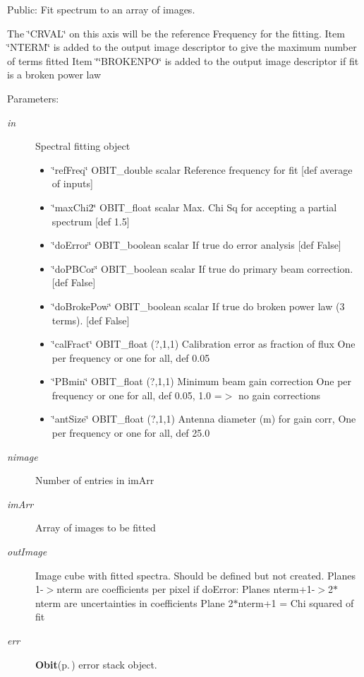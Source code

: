 Public: Fit spectrum to an array of images. 

The \char`\"{}CRVAL\char`\"{} on this axis will be the reference Frequency for the fitting. Item \char`\"{}NTERM\char`\"{} is added to the output image descriptor to give the maximum number of terms fitted Item \char`\"{}\char`\"{}BROKENPO\char`\"{} is added to the output image descriptor if fit is a broken power law \begin{Desc}
\item[Parameters:]
\begin{description}
\item[{\em in}]Spectral fitting object \begin{itemize}
\item \char`\"{}ref\-Freq\char`\"{} OBIT\_\-double scalar Reference frequency for fit [def average of inputs] \item \char`\"{}max\-Chi2\char`\"{} OBIT\_\-float scalar Max. Chi Sq for accepting a partial spectrum [def 1.5] \item \char`\"{}do\-Error\char`\"{} OBIT\_\-boolean scalar If true do error analysis [def False] \item \char`\"{}do\-PBCor\char`\"{} OBIT\_\-boolean scalar If true do primary beam correction.[def False] \item \char`\"{}do\-Broke\-Pow\char`\"{} OBIT\_\-boolean scalar If true do broken power law (3 terms). [def False] \item \char`\"{}cal\-Fract\char`\"{} OBIT\_\-float (?,1,1) Calibration error as fraction of flux One per frequency or one for all, def 0.05 \item \char`\"{}PBmin\char`\"{} OBIT\_\-float (?,1,1) Minimum beam gain correction One per frequency or one for all, def 0.05, 1.0 =$>$ no gain corrections \item \char`\"{}ant\-Size\char`\"{} OBIT\_\-float (?,1,1) Antenna diameter (m) for gain corr, One per frequency or one for all, def 25.0 \end{itemize}
\item[{\em nimage}]Number of entries in im\-Arr \item[{\em im\-Arr}]Array of images to be fitted \item[{\em out\-Image}]Image cube with fitted spectra. Should be defined but not created. Planes 1-$>$nterm are coefficients per pixel if do\-Error: Planes nterm+1-$>$2$\ast$nterm are uncertainties in coefficients Plane 2$\ast$nterm+1 = Chi squared of fit \item[{\em err}]{\bf Obit}{\rm (p.\,\pageref{structObit})} error stack object. \end{description}
\end{Desc}

